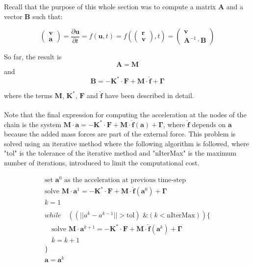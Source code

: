 \documentclass[10pt] {article}
\newcommand{\ba}{\begin{array}}
\newcommand{\ea}{\end{array}}
\newcommand{\pa}{\partial}
\begin{document}
Recall that the purpose of this whole section was to compute a matrix $\mathbf{A}$ and a vector $\mathbf{B}$ such that:

$$\left(\ba{c} \mathbf{v} \\ \mathbf{a} \ea\right) = \frac{\pa\mathbf{u}}{\pa t} = f(\mathbf{u}, t) = f(\left(\ba{c} \mathbf{r} \\ \mathbf{v} \ea\right), t) = \left(\ba{c} \mathbf{v} \\ \mathbf{A}^{-1}\cdot\mathbf{B} \ea\right)$$

So far, the result is$$\mathbf{A} = \mathbf{M}$$and$$\mathbf{B} = -\mathbf{K}^*\cdot\mathbf{F}+\mathbf{M}\cdot\hat{\mathbf{f}}+\mathbf{\Gamma}$$

where the terms $\mathbf{M}$, $\mathbf{K}^*$, $\mathbf{F}$ and $\hat{\mathbf{f}}$ have been described in detail.\\ \\

Note that the final expression for computing the acceleration at the nodes of the chain is the system $\mathbf{M} \cdot \mathbf{a} =-\mathbf{K}^*\cdot\mathbf{F}+\mathbf{M}\cdot\hat{\mathbf{f}}(\mathbf{a})+\mathbf{\Gamma}$, where $\hat{\mathbf{f}}$ depends on $\mathbf{a}$ because the added mass forces are part of the external force. This problem is solved using an iterative method where the following algorithm is followed, where "tol" is the tolerance of the iterative method and "nIterMax" is the maximum number of iterations, introduced to limit the computational cost.

\begin{equation}
\nonumber
\ba{l} \text{set }\mathbf{a}^0\text{ as the acceleration at previous time-step}\\
\text{solve   }\mathbf{M} \cdot \mathbf{a}^{1} =-\mathbf{K}^*\cdot\mathbf{F}+\mathbf{M}\cdot\hat{\mathbf{f}}(\mathbf{a}^{0})+\mathbf{\Gamma}\\
k = 1\\
\\
while \quad ((||a^{k}-a^{k-1}||>\text{tol})\text{  \&  }(k<\text{nIterMax}))\{ \\
\quad \text{solve   }\mathbf{M} \cdot \mathbf{a}^{k+1} =-\mathbf{K}^*\cdot\mathbf{F}+\mathbf{M}\cdot\hat{\mathbf{f}}(\mathbf{a}^{k})+\mathbf{\Gamma}\\
\quad k = k + 1\\
\}\\
\mathbf{a} = \mathbf{a}^{k}\\
\ea 
\end{equation}
\end{document}
